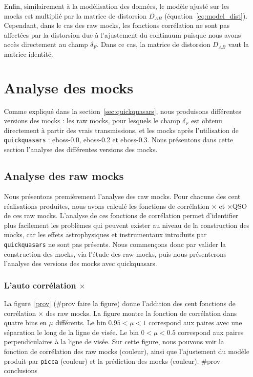 \documentclass[11pt, twoside, a4paper, openright]{report}
\begin{document}
Enfin, similairement à la modélisation des données, le modèle ajusté sur les mocks est multiplié par la matrice de distorsion $D_{AB}$ (équation~\ref{eq:model_dist}). Cependant, dans le cas des raw mocks, les fonctions corrélation ne sont pas affectées par la distorsion due à l'ajustement du continuum puisque nous avons accès directement au champ $\delta_F$. Dans ce cas, la matrice de distorsion $D_{AB}$ vaut la matrice identité.


\section{Analyse des mocks}
Comme expliqué dans la section~\ref{sec:quickquasars}, nous produisons différentes versions des mocks : les raw mocks, pour lesquels le champ $\delta_F$ est obtenu directement à partir des vrais transmissions, et les mocks après l'utilisation de \texttt{quickquasars} : eboss-0.0, eboss-0.2 et eboss-0.3.
Nous présentons dans cette section l'analyse des différentes versions des mocks.


\subsection{Analyse des raw mocks}
Nous présentons premièrement l'analyse des raw mocks.
Pour chacune des cent réalisations produites, nous avons calculé les fonctions de corrélation \lya{}$\times$\lya{} et \lya{}$\times$QSO de ces raw mocks.
L'analyse de ces fonctions de corrélation permet d'identifier plus facilement les problèmes qui peuvent exister au niveau de la construction des mocks, car les effets astrophysiques et instrumentaux introduits par \texttt{quickquasars} ne sont pas présents. Nous commençons donc par valider la construction des mocks, via l'étude des raw mocks, puis nous présenterons l'analyse des versions des mocks avec quickquasars.

\subsubsection{L'auto corrélation \lya{}$\times$\lya{}}
La figure~\ref{prov} (\#prov faire la figure) donne l'addition des cent fonctions de corrélation \lya{}$\times$\lya{} des raw mocks.
La figure montre la fonction de corrélation dans quatre bins en $\mu$ différents. Le bin $\num{0.95} < \mu < 1$ correspond aux paires avec une séparation le long de la ligne de visée. Le bin $\num{0} < \mu < \num{0.5}$ correspond aux paires perpendiculaires à la ligne de visée.
Sur cette figure, nous pouvons voir la fonction de corrélation des raw mocks (couleur), ainsi que l'ajustement du modèle produit par \texttt{picca} (couleur) et la prédiction des mocks (couleur).
\#prov  conclusions
\end{document}
